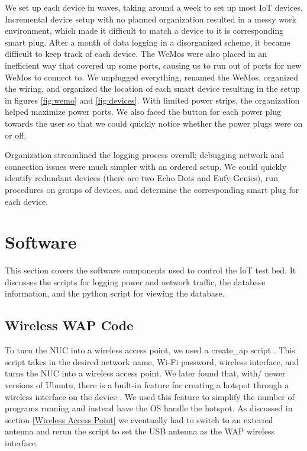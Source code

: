 We set up each device in waves, taking around a week to set up most IoT devices. Incremental device setup with no planned organization resulted in a messy work environment, which made it difficult to match a device to it is corresponding smart plug. After a month of data logging in a disorganized scheme, it became difficult to keep track of each device. The WeMos were also placed in an inefficient way that covered up some ports, causing us to run out of ports for new WeMos to connect to. We unplugged everything, renamed the WeMos, organized the wiring, and organized the location of each smart device resulting in the setup in figures \ref{fig:wemo} and \ref{fig:devices}. With limited power strips, the organization helped maximize power ports. We also faced the button for each power plug towards the user so that we could quickly notice whether the power plugs were on or off.

Organization streamlined the logging process overall; debugging network and connection issues were much simpler with an ordered setup. We could quickly identify redundant devices (there are two Echo Dots and Eufy Genies), run procedures on groups of devices, and determine the corresponding smart plug for each device.

\section{Software}
\label{software}
This section covers the software components used to control the IoT test bed. It discusses the scripts for logging power and network traffic, the database information, and the python script for viewing the database.

\subsection{Wireless WAP Code}
To turn the NUC into a wireless access point, we used a create\_ap script \cite{oblique_2017}. This script takes in the desired network name, Wi-Fi password, wireless interface, and turns the NUC into a wireless access point. We later found that, with/ newer versions of Ubuntu, there is a built-in feature for creating a hotspot through a wireless interface on the device \cite{m_2016}. We used this feature to simplify the number of programs running and instead have the OS handle the hotspot. As discussed in section \ref{Wireless Access Point} we eventually had to switch to an external antenna and rerun the script to set the USB antenna as the WAP wireless interface.

